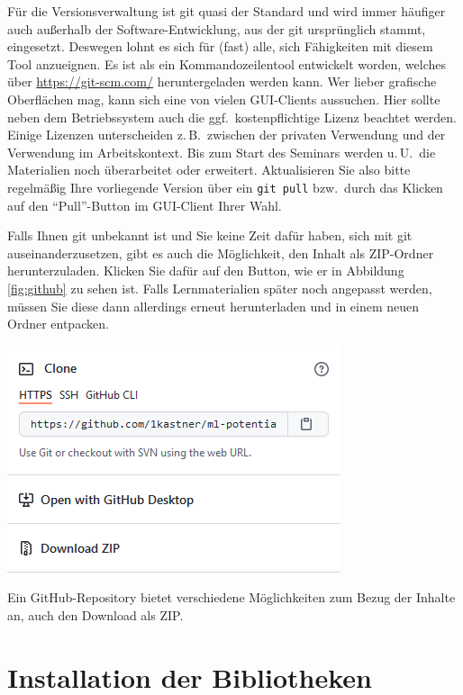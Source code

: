 \documentclass{tufte-handout}
\begin{document}
Für die Versionsverwaltung ist git quasi der Standard und wird immer häufiger auch außerhalb der Software-Entwicklung, aus der git ursprünglich stammt, eingesetzt.
Deswegen lohnt es sich für (fast) alle, sich Fähigkeiten mit diesem Tool anzueignen.
Es ist als ein Kommandozeilentool entwickelt worden, welches über \url{https://git-scm.com/} heruntergeladen werden kann.
Wer lieber grafische Oberflächen mag, kann sich eine von vielen GUI-Clients%
aussuchen.
Hier sollte neben dem Betriebssystem auch die ggf.\ kostenpflichtige Lizenz beachtet werden.
Einige Lizenzen unterscheiden z.\,B.\ zwischen der privaten Verwendung und der Verwendung im Arbeitskontext.
Bis zum Start des Seminars werden u.\,U.\ die Materialien noch überarbeitet oder erweitert.
Aktualisieren Sie also bitte regelmäßig Ihre vorliegende Version über ein \texttt{git pull} bzw.\ durch das Klicken auf den \enquote{Pull}-Button im GUI-Client Ihrer Wahl.

Falls Ihnen git unbekannt ist und Sie keine Zeit dafür haben, sich mit git auseinanderzusetzen, gibt es auch die Möglichkeit, den Inhalt als ZIP-Ordner herunterzuladen.
Klicken Sie dafür auf den Button, wie er in Abbildung\,\ref{fig:github} zu sehen ist.
Falls Lernmaterialien später noch angepasst werden, müssen Sie diese dann allerdings erneut herunterladen und in einem neuen Ordner entpacken.

\begin{marginfigure}
  \includegraphics{github-zip}
  \caption{Ein GitHub-Repository bietet verschiedene Möglichkeiten zum Bezug der Inhalte an, auch den Download als ZIP.}%
\label{fig:github}
\end{marginfigure}


\section{Installation der Bibliotheken}
\end{document}
